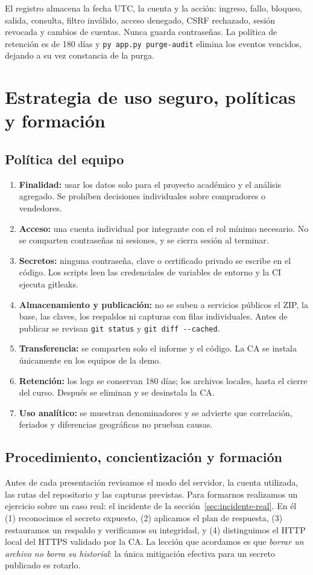 \documentclass[12pt,a4paper]{article}
\begin{document}
El registro almacena la fecha UTC, la cuenta y la acción: ingreso, fallo, bloqueo, salida, consulta, filtro inválido, acceso denegado, CSRF rechazado, sesión revocada y cambios de cuentas. Nunca guarda contraseñas. La política de retención es de 180 días y \texttt{py app.py purge-audit} elimina los eventos vencidos, dejando a su vez constancia de la purga.

\section{Estrategia de uso seguro, políticas y formación}
\label{sec:politicas}
\subsection{Política del equipo}
\begin{enumerate}
\item \textbf{Finalidad:} usar los datos solo para el proyecto académico y el análisis agregado. Se prohíben decisiones individuales sobre compradores o vendedores.
\item \textbf{Acceso:} una cuenta individual por integrante con el rol mínimo necesario. No se comparten contraseñas ni sesiones, y se cierra sesión al terminar.
\item \textbf{Secretos:} ninguna contraseña, clave o certificado privado se escribe en el código. Los scripts leen las credenciales de variables de entorno y la CI ejecuta gitleaks.
\item \textbf{Almacenamiento y publicación:} no se suben a servicios públicos el ZIP, la base, las claves, los respaldos ni capturas con filas individuales. Antes de publicar se revisan \texttt{git status} y \texttt{git diff -{}-cached}.
\item \textbf{Transferencia:} se comparten solo el informe y el código. La CA se instala únicamente en los equipos de la demo.
\item \textbf{Retención:} los logs se conservan 180 días; los archivos locales, hasta el cierre del curso. Después se eliminan y se desinstala la CA.
\item \textbf{Uso analítico:} se muestran denominadores y se advierte que correlación, feriados y diferencias geográficas no prueban causas.
\end{enumerate}

\subsection{Procedimiento, concientización y formación}
Antes de cada presentación revisamos el modo del servidor, la cuenta utilizada, las rutas del repositorio y las capturas previstas. Para formarnos realizamos un ejercicio sobre un caso real: el incidente de la sección~\ref{sec:incidente-real}. En él (1) reconocimos el secreto expuesto, (2) aplicamos el plan de respuesta, (3) restauramos un respaldo y verificamos su integridad, y (4) distinguimos el HTTP local del HTTPS validado por la CA. La lección que acordamos es que \emph{borrar un archivo no borra su historial}: la única mitigación efectiva para un secreto publicado es rotarlo.
\end{document}
